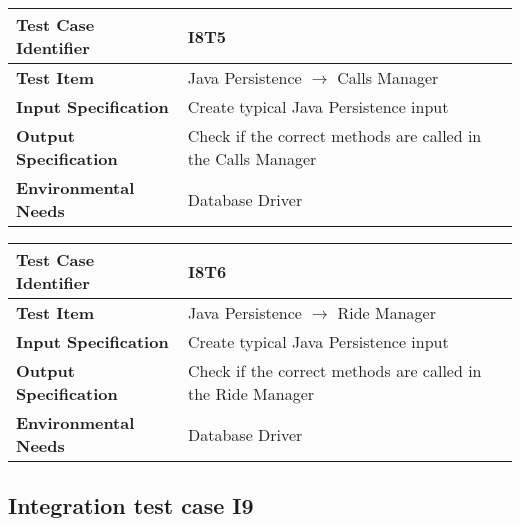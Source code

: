 \begin{table}[!htbp]
\begin{center}
\begin{tabular}[t]{p{}p{}}

\hline
\textbf{Test Case Identifier} & I8T5 \\
\hline
\textbf{Test Item} & Java Persistence $\rightarrow$ Calls Manager \\
\hline
\textbf{Input Specification} & Create typical Java Persistence input \\
\hline
\textbf{Output Specification} & Check if the correct methods are called in the Calls Manager \\
\hline
\textbf{Environmental Needs} & Database Driver \\
\hline

\end{tabular}
\end{center}
\end{table}

\begin{table}[!htbp]
\begin{center}
\begin{tabular}[t]{p{}p{}}

\hline
\textbf{Test Case Identifier} & I8T6 \\
\hline
\textbf{Test Item} & Java Persistence $\rightarrow$ Ride Manager \\
\hline
\textbf{Input Specification} & Create typical Java Persistence input \\
\hline
\textbf{Output Specification} & Check if the correct methods are called in the Ride Manager \\
\hline
\textbf{Environmental Needs} & Database Driver \\
\hline

\end{tabular}
\end{center}
\end{table}
\clearpage


\subsection{Integration test case I9}

